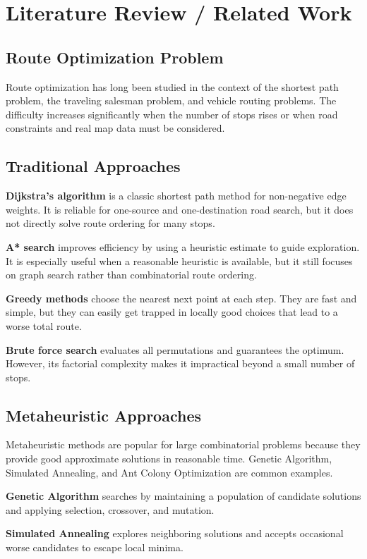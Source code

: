 \section{Literature Review / Related Work}
\subsection{Route Optimization Problem}
Route optimization has long been studied in the context of the shortest path problem, the traveling salesman problem, and vehicle routing problems. The difficulty increases significantly when the number of stops rises or when road constraints and real map data must be considered.

\subsection{Traditional Approaches}
\textbf{Dijkstra's algorithm} is a classic shortest path method for non-negative edge weights. It is reliable for one-source and one-destination road search, but it does not directly solve route ordering for many stops.

\textbf{A* search} improves efficiency by using a heuristic estimate to guide exploration. It is especially useful when a reasonable heuristic is available, but it still focuses on graph search rather than combinatorial route ordering.

\textbf{Greedy methods} choose the nearest next point at each step. They are fast and simple, but they can easily get trapped in locally good choices that lead to a worse total route.

\textbf{Brute force search} evaluates all permutations and guarantees the optimum. However, its factorial complexity makes it impractical beyond a small number of stops.

\subsection{Metaheuristic Approaches}
Metaheuristic methods are popular for large combinatorial problems because they provide good approximate solutions in reasonable time. Genetic Algorithm, Simulated Annealing, and Ant Colony Optimization are common examples.

\textbf{Genetic Algorithm} searches by maintaining a population of candidate solutions and applying selection, crossover, and mutation.

\textbf{Simulated Annealing} explores neighboring solutions and accepts occasional worse candidates to escape local minima.

